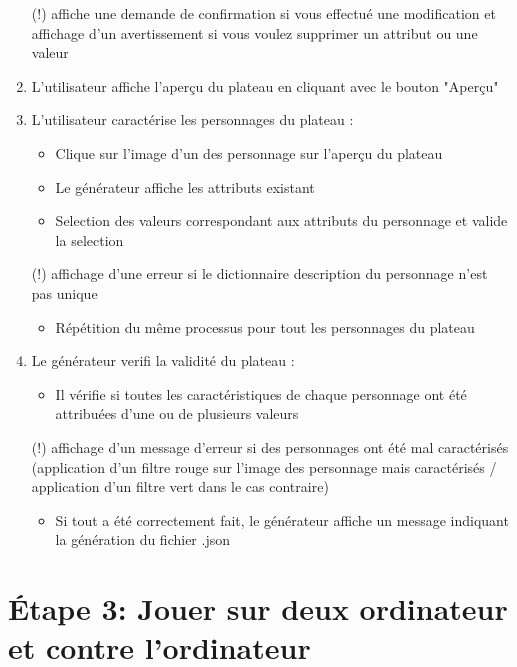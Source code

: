 \documentclass[a4paper]{article}
\begin{document}
\begin{enumerate}
 (!) affiche une demande de confirmation si vous effectué une modification et affichage d'un avertissement si vous voulez supprimer un attribut ou une valeur
 \item L'utilisateur affiche l'aperçu du plateau en cliquant avec le bouton "Aperçu"
 \item L'utilisateur caractérise les personnages du plateau :
 \begin{itemize}
     \item Clique sur l'image d'un des personnage sur l'aperçu du plateau 
     \item Le générateur affiche les attributs existant
     \item Selection des valeurs correspondant aux attributs du personnage et valide la selection 
 \end{itemize}
 
 (!) affichage d'une erreur si le dictionnaire description du personnage n'est pas unique
 
 \begin{itemize}
     \item Répétition du même processus pour tout les personnages du plateau
 \end{itemize}
 
 \item Le générateur verifi la validité du plateau :
 \begin{itemize}
     \item Il vérifie si toutes les caractéristiques de chaque personnage ont été attribuées d'une ou de plusieurs valeurs 
 \end{itemize}
 
 (!) affichage d'un message d'erreur si des personnages ont été mal caractérisés (application d'un filtre rouge sur l'image des personnage mais caractérisés / application d'un filtre vert dans le cas contraire)
 
   \begin{itemize}
     \item Si tout a été correctement fait, le générateur affiche un message indiquant la génération du fichier .json
 \end{itemize}
 \end{enumerate}
 
 \clearpage
 \section{Étape 3: Jouer sur deux ordinateur et contre l'ordinateur}
\end{document}
